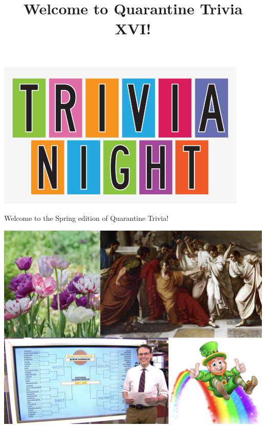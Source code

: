 \documentclass[11pt]{beamer}
\begin{document}
\title{Welcome to Quarantine Trivia XVI!}
\date{}

\begin{frame}
\titlepage{}
\begin{center}
\includegraphics[max width=0.9\textwidth,
    max height=0.4\textheight]{Images/triviatitleframelogo.png}
\end{center}
\end{frame}

\begin{frame}
Welcome to the Spring edition of Quarantine Trivia!
\pause
\begin{center}
\includegraphics[max width=\textwidth,max height=\textheight]{Images/march.jpg}
\end{center}
\end{frame}
\end{document}
